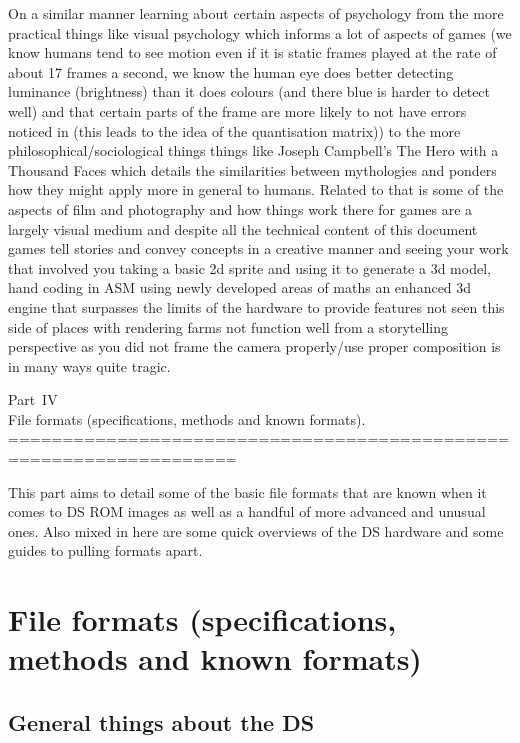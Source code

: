 \documentclass[
]{book}
\begin{document}
On a similar manner learning about certain aspects of psychology from the more practical things like visual psychology which informs a lot of aspects of games (we know humans tend to see motion even if it is static frames played at the rate of about 17 frames a second, we know the human eye does better detecting luminance (brightness) than it does colours (and there blue is harder to detect well) and that certain parts of the frame are more likely to not have errors noticed in (this leads to the idea of the quantisation matrix)) to the more philosophical/sociological things things like Joseph Campbell's The Hero with a Thousand Faces which details the similarities between mythologies and ponders how they might apply more in general to humans. Related to that is some of the aspects of film and photography and how things work there for games are a largely visual medium and despite all the technical content of this document games tell stories and convey concepts in a creative manner and seeing your work that involved you taking a basic 2d sprite and using it to generate a 3d model, hand coding in ASM using newly developed areas of maths an enhanced 3d engine that surpasses the limits of the hardware to provide features not seen this side of places with rendering farms not function well from a storytelling perspective as you did not frame the camera properly/use proper composition is in many ways quite tragic.

Part~IV\\
File formats (specifications, methods and known formats).
===================================================================

This part aims to detail some of the basic file formats that are known when it comes to DS ROM images as well as a handful of more advanced and unusual ones. Also mixed in here are some quick overviews of the DS hardware and some guides to pulling formats apart.

\hypertarget{part-file-formats-specifications-methods-and-known-formats}{%
\part{File formats (specifications, methods and known formats)}\label{part-file-formats-specifications-methods-and-known-formats}}

\hypertarget{general-things-about-the-ds}{%
\chapter{General things about the DS}\label{general-things-about-the-ds}}
\end{document}
